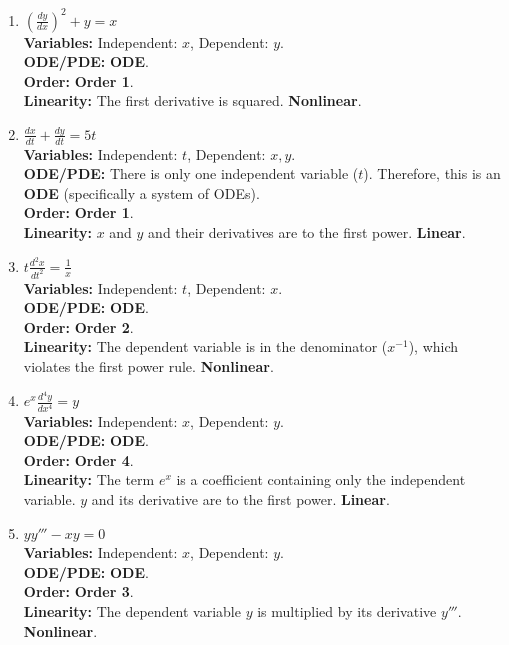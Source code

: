 \documentclass{article}
\begin{document}
\begin{enumerate}
    \item $\left( \frac{dy}{dx} \right)^2 + y = x$ \\
    \textbf{Variables:} Independent: $x$, Dependent: $y$. \\
    \textbf{ODE/PDE:} \textbf{ODE}. \\
    \textbf{Order:} \textbf{Order 1}. \\
    \textbf{Linearity:} The first derivative is squared. \textbf{Nonlinear}.
    
    \item $\frac{dx}{dt} + \frac{dy}{dt} = 5t$ \\
    \textbf{Variables:} Independent: $t$, Dependent: $x, y$. \\
    \textbf{ODE/PDE:} There is only one independent variable ($t$). Therefore, this is an \textbf{ODE} (specifically a system of ODEs). \\
    \textbf{Order:} \textbf{Order 1}. \\
    \textbf{Linearity:} $x$ and $y$ and their derivatives are to the first power. \textbf{Linear}.
    
    \item $t \frac{d^2 x}{dt^2} = \frac{1}{x}$ \\
    \textbf{Variables:} Independent: $t$, Dependent: $x$. \\
    \textbf{ODE/PDE:} \textbf{ODE}. \\
    \textbf{Order:} \textbf{Order 2}. \\
    \textbf{Linearity:} The dependent variable is in the denominator ($x^{-1}$), which violates the first power rule. \textbf{Nonlinear}.
    
    \item $e^x \frac{d^4 y}{dx^4} = y$ \\
    \textbf{Variables:} Independent: $x$, Dependent: $y$. \\
    \textbf{ODE/PDE:} \textbf{ODE}. \\
    \textbf{Order:} \textbf{Order 4}. \\
    \textbf{Linearity:} The term $e^x$ is a coefficient containing only the independent variable. $y$ and its derivative are to the first power. \textbf{Linear}.
    
    \item $y y''' - x y = 0$ \\
    \textbf{Variables:} Independent: $x$, Dependent: $y$. \\
    \textbf{ODE/PDE:} \textbf{ODE}. \\
    \textbf{Order:} \textbf{Order 3}. \\
    \textbf{Linearity:} The dependent variable $y$ is multiplied by its derivative $y'''$. \textbf{Nonlinear}.
    

\end{enumerate}
\end{document}
